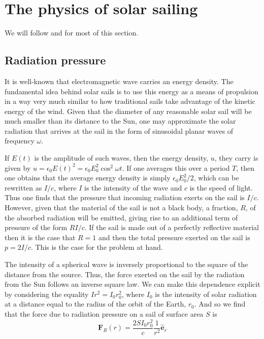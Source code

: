 \documentclass[twocolumn,12pt,a4paper]{article}
\numberwithin{equation}{section}
\begin{document}
\section{The physics of solar sailing}
We will follow \cite{tsu} and \cite[Ch. 4]{mcinnes} for most of this section.
\subsection{Radiation pressure}
It is well-known that electromagnetic wave carries an energy density. The fundamental idea behind solar sails is to use this energy as a means of propulsion in a way very much similar to how traditional sails take advantage of the kinetic energy of the wind. Given that the diameter of any reasonable solar sail will be much smaller than its distance to the Sun, one may approximate the solar radiation that arrives at the sail in the form of sinusoidal planar waves of frequency \( \omega \).

If \( E(t) \) is the amplitude of such waves, then the energy density, \( u \), they carry is given by \( u = \epsilon_0 E(t)^2 = \epsilon_0 E_0^2 \cos^2{\omega t} \). If one averages this over a period \( T \), then one obtains that the average energy density is simply \( \epsilon_0 E_0^2 /2 \), which can be rewritten as \( I/c \), where \( I \) is the intensity of the wave and \( c \) is the speed of light. Thus one finds that the pressure that incoming radiation exerts on the sail is \( I/c \). However, given that the material of the sail is not a black body, a fraction, \( R \), of the absorbed radiation will be emitted, giving rise to an additional term of pressure of the form \( RI/c \). If the sail is made out of a perfectly reflective material then it is the case that \( R = 1 \) and then the total pressure exerted on the sail is \( p = 2I/c \). This is the case for the problem at hand.

The intensity of a spherical wave is inversely proportional to the square of the distance from the source. Thus, the force exerted on the sail by the radiation from the Sun follows an inverse square law. We can make this dependence explicit by considering the equality \( Ir^2 = I_0 r^2_0 \), where \( I_0 \) is the intensity of solar radiation at a distance equal to the radius of the orbit of the Earth, \( r_0 \). And so we find that the force due to radiation pressure on a sail of surface area \( S \) is
\begin{equation}
 	\mathbf{F}_R(r) = \dfrac{2SI_0r_0^2}{c}\dfrac{1}{r^2} \mathbf{\hat{e}}_r \label{eq:radiation force}
\end{equation}
\end{document}
